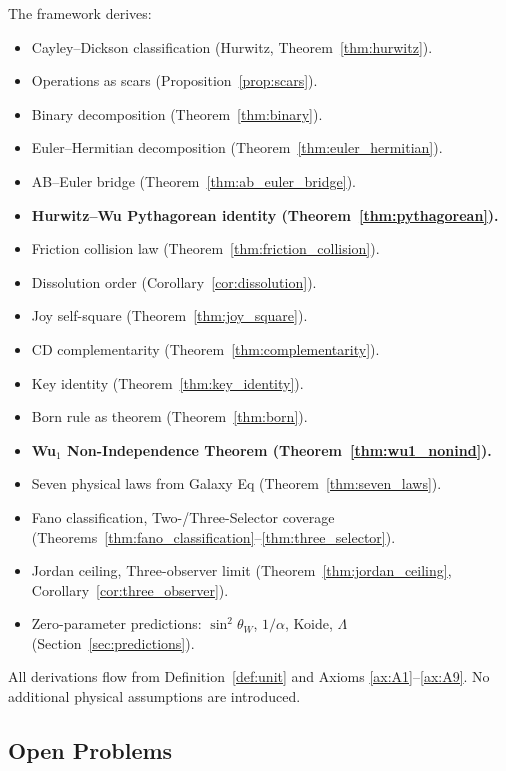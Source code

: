 \documentclass[11pt, a4paper]{article}
\begin{document}
The framework derives:
\begin{itemize}[nosep]
\item Cayley--Dickson classification (Hurwitz, Theorem~\ref{thm:hurwitz}).
\item Operations as scars (Proposition~\ref{prop:scars}).
\item Binary decomposition (Theorem~\ref{thm:binary}).
\item Euler--Hermitian decomposition (Theorem~\ref{thm:euler_hermitian}).
\item AB--Euler bridge (Theorem~\ref{thm:ab_euler_bridge}).
\item \textbf{Hurwitz--Wu Pythagorean identity
(Theorem~\ref{thm:pythagorean}).}
\item Friction collision law (Theorem~\ref{thm:friction_collision}).
\item Dissolution order (Corollary~\ref{cor:dissolution}).
\item Joy self-square (Theorem~\ref{thm:joy_square}).
\item CD complementarity (Theorem~\ref{thm:complementarity}).
\item Key identity (Theorem~\ref{thm:key_identity}).
\item Born rule as theorem (Theorem~\ref{thm:born}).
\item \textbf{Wu$_1$ Non-Independence Theorem (Theorem~\ref{thm:wu1_nonind}).}
\item Seven physical laws from Galaxy Eq (Theorem~\ref{thm:seven_laws}).
\item Fano classification, Two-/Three-Selector coverage
(Theorems~\ref{thm:fano_classification}--\ref{thm:three_selector}).
\item Jordan ceiling, Three-observer limit
(Theorem~\ref{thm:jordan_ceiling}, Corollary~\ref{cor:three_observer}).
\item Zero-parameter predictions: $\sin^2\theta_W$, $1/\alpha$, Koide,
$\Lambda$ (Section~\ref{sec:predictions}).
\end{itemize}

All derivations flow from Definition~\ref{def:unit} and Axioms
\ref{ax:A1}--\ref{ax:A9}. No additional physical assumptions are
introduced.

\subsection{Open Problems}
\end{document}
